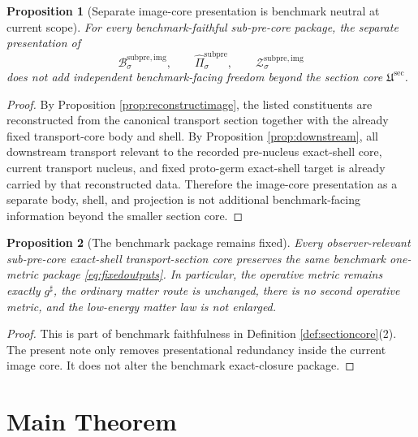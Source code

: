 \documentclass[11pt]{article}
\newcommand{\CompletedMetric}{g^{\sharp}}
\newcommand{\SubPreImgBody}[1]{\mathcal B_{#1}^{\mathrm{subpre,img}}}
\newcommand{\SubPreImgProj}[1]{\widehat{\Pi}_{#1}^{\mathrm{subpre}}}
\newcommand{\SubPreImgShell}[1]{\mathcal Z_{#1}^{\mathrm{subpre,img}}}
\newcommand{\SubPreSectionCore}{\mathfrak U^{\mathrm{sec}}}
\newtheorem{proposition}{Proposition}
\begin{document}
\begin{proposition}[Separate image-core presentation is benchmark neutral at current scope]
\label{prop:neutral}
For every benchmark-faithful sub-pre-core package, the separate presentation of
\[
\SubPreImgBody{\sigma},
\qquad
\SubPreImgProj{\sigma},
\qquad
\SubPreImgShell{\sigma}
\]
does not add independent benchmark-facing freedom beyond the section core \(\SubPreSectionCore\).
\end{proposition}

\begin{proof}
By Proposition \ref{prop:reconstructimage}, the listed constituents are reconstructed from the canonical transport section together with the already fixed transport-core body and shell. By Proposition \ref{prop:downstream}, all downstream transport relevant to the recorded pre-nucleus exact-shell core, current transport nucleus, and fixed proto-germ exact-shell target is already carried by that reconstructed data. Therefore the image-core presentation as a separate body, shell, and projection is not additional benchmark-facing information beyond the smaller section core.
\end{proof}

\begin{proposition}[The benchmark package remains fixed]
\label{prop:benchmark}
Every observer-relevant sub-pre-core exact-shell transport-section core preserves the same benchmark one-metric package \eqref{eq:fixedoutputs}. In particular, the operative metric remains exactly \(\CompletedMetric\), the ordinary matter route is unchanged, there is no second operative metric, and the low-energy matter law is not enlarged.
\end{proposition}

\begin{proof}
This is part of benchmark faithfulness in Definition \ref{def:sectioncore}(2). The present note only removes presentational redundancy inside the current image core. It does not alter the benchmark exact-closure package.
\end{proof}

\section{Main Theorem}
\end{document}
